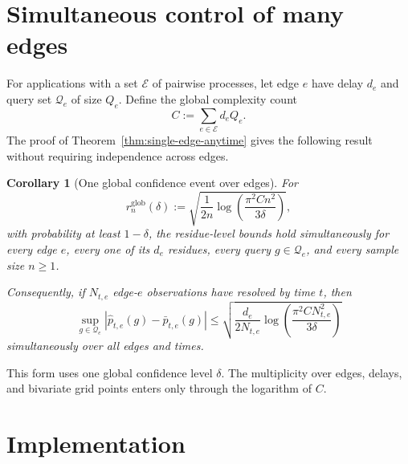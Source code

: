 \documentclass[11pt]{article}
\newtheorem{corollary}[theorem]{Corollary}
\newcommand{\Q}{\mathcal{Q}}
\newcommand{\cE}{\mathcal{E}}
\newcommand{\1}{\mathbf{1}}
\begin{document}
\section{Simultaneous control of many edges}

For applications with a set $\cE$ of pairwise processes, let edge $e$ have
delay $d_e$ and query set $\Q_e$ of size $Q_e$.  Define the global complexity
count
\begin{equation}
    C
    :=
    \sum_{e\in\cE} d_e Q_e.
    \label{eq:global-C}
\end{equation}
The proof of Theorem~\ref{thm:single-edge-anytime} gives the following result
without requiring independence across edges.

\begin{corollary}[One global confidence event over edges]
\label{cor:multi-edge}
For
\begin{equation}
    r_n^{\mathrm{glob}}(\delta)
    :=
    \sqrt{
        \frac1{2n}
        \log\!\left(
            \frac{\pi^2 C n^2}{3\delta}
        \right)
    },
    \label{eq:global-rn}
\end{equation}
with probability at least $1-\delta$, the residue-level bounds hold
simultaneously for every edge $e$, every one of its $d_e$ residues, every query
$g\in\Q_e$, and every sample size $n\ge1$.

Consequently, if $N_{t,e}$ edge-$e$ observations have resolved by time $t$,
then
\begin{equation}
\boxed{
    \sup_{g\in\Q_e}
    \left|
        \widehat p_{t,e}(g)-\bar p_{t,e}(g)
    \right|
    \le
    \sqrt{
        \frac{d_e}{2N_{t,e}}
        \log\!\left(
            \frac{\pi^2 C N_{t,e}^2}{3\delta}
        \right)
    }
}
\label{eq:multi-edge-rate}
\end{equation}
simultaneously over all edges and times.
\end{corollary}

This form uses one global confidence level $\delta$.  The multiplicity over
edges, delays, and bivariate grid points enters only through the logarithm of
$C$.

\section{Implementation}
\end{document}
